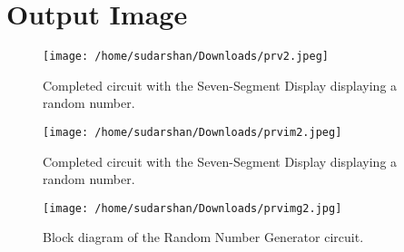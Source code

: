 \documentclass{article}
\begin{document}
\section{Output Image}
\begin{figure}[h]
  \centering
  \texttt{[image: /home/sudarshan/Downloads/prv2.jpeg]}
  \caption{Completed circuit with the Seven-Segment Display displaying a random number.}
\end{figure}
\begin{figure}[h]
  \centering
  \texttt{[image: /home/sudarshan/Downloads/prvim2.jpeg]}
  \caption{Completed circuit with the Seven-Segment Display displaying a random number.}
\end{figure}


\begin{figure}[h]
  \centering
  \texttt{[image: /home/sudarshan/Downloads/prvimg2.jpg]}
  \caption{Block diagram of the Random Number Generator circuit.}
\end{figure}
\end{document}
